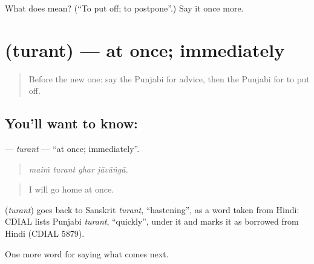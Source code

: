 \begin{tcolorbox}[breakable,colback=teal!4,colframe=teal!35!black,title={Before you move on}]
What does  mean? (\textquotedblleft{}To put off; to postpone\textquotedblright{}.) Say it once more.
\end{tcolorbox}
\section[\texorpdfstring{\pa{ਤੁਰੰਤ} (turant)}{ਤੁਰੰਤ (turant)}]{ (turant) — at once; immediately}

\label{lesson:PA-C281-turant}



\begin{quote}
Before the new one: say the Punjabi for advice, then the Punjabi for to put off.
\end{quote}

\subsection*{You'll want to know: }
\textbf{} — \emph{turant} — \textquotedblleft{}at once; immediately\textquotedblright{}.

\begin{quote}
   
\end{quote}

\begin{quote}
\emph{maiṁ turant ghar jāvāṅgā.}
\end{quote}

\begin{quote}
I will go home at once.
\end{quote}

\begin{cousinweb}
\textbf{} (\emph{turant}) goes back to Sanskrit \emph{turant}, \textquotedblleft{}hastening\textquotedblright{}, as a word taken from Hindi: CDIAL lists Punjabi \emph{turant}, \textquotedblleft{}quickly\textquotedblright{}, under it and marks it as borrowed from Hindi (CDIAL 5879).
\end{cousinweb}

\begin{grammarlens}[title={What you've built}]
One more word for saying what comes next.
\end{grammarlens}

